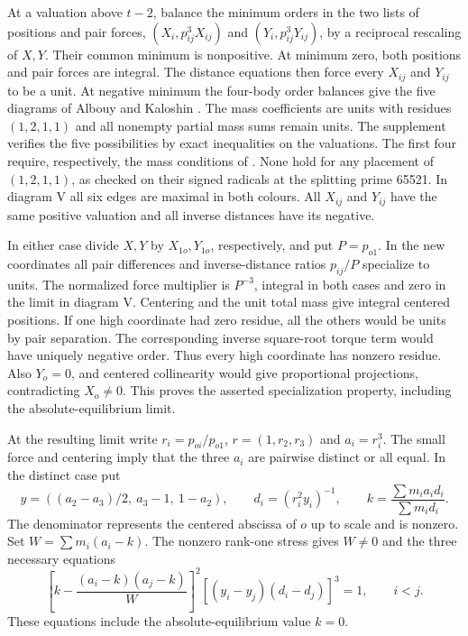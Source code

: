 \documentclass[11pt]{article}
\begin{document}
At a valuation above $t-2$, balance the minimum orders in the two lists of positions and pair forces, $(X_i,p_{ij}^3 X_{ij})$ and $(Y_i,p_{ij}^3 Y_{ij})$, by a reciprocal rescaling of $X,Y$. Their common minimum is nonpositive. At minimum zero, both positions and pair forces are integral. The distance equations then force every $X_{ij}$ and $Y_{ij}$ to be a unit. At negative minimum the four-body order balances give the five diagrams of Albouy and Kaloshin \cite[Fig.~8 and \S5]{AK}. The mass coefficients are units with residues $(1,2,1,1)$ and all nonempty partial mass sums remain units. The supplement verifies the five possibilities by exact inequalities on the valuations. The first four require, respectively, the mass conditions of \cite[\S\S5.1--5.4]{AK}. None hold for any placement of $(1,2,1,1)$, as checked on their signed radicals at the splitting prime 65521. In diagram V all six edges are maximal in both colours. All $X_{ij}$ and $Y_{ij}$ have the same positive valuation and all inverse distances have its negative.

In either case divide $X,Y$ by $X_{1o},Y_{1o}$, respectively, and put $P=p_{o1}$. In the new coordinates all pair differences and inverse-distance ratios $p_{ij}/P$ specialize to units. The normalized force multiplier is $P^{-3}$, integral in both cases and zero in the limit in diagram V. Centering and the unit total mass give integral centered positions. If one high coordinate had zero residue, all the others would be units by pair separation. The corresponding inverse square-root torque term would have uniquely negative order. Thus every high coordinate has nonzero residue. Also $Y_o=0$, and centered collinearity would give proportional projections, contradicting $X_o\ne0$. This proves the asserted specialization property, including the absolute-equilibrium limit.

At the resulting limit write $r_i=p_{oi}/p_{o1}$, $r=(1,r_2,r_3)$ and $a_i=r_i^3$. The small force and centering imply that the three $a_i$ are pairwise distinct or all equal. In the distinct case put
\[
 y=((a_2-a_3)/2,\ a_3-1,\ 1-a_2),\qquad
 d_i=(r_i^2y_i)^{-1},\qquad
 k=\frac{\sum m_i a_i d_i}{\sum m_i d_i}.
\]
The denominator represents the centered abscissa of $o$ up to scale and is nonzero. Set $W=\sum m_i(a_i-k)$. The nonzero rank-one stress gives $W\ne0$ and the three necessary equations
\[
 \left[k-\frac{(a_i-k)(a_j-k)}W\right]^2
              [(y_i-y_j)(d_i-d_j)]^3=1,\qquad i<j.
\]
These equations include the absolute-equilibrium value $k=0$.
\end{document}

